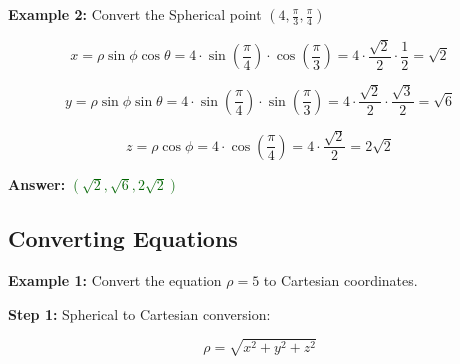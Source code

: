 \documentclass[10pt]{article}                               %
\begin{document}
\begin{adjustwidth}{2em}{0pt}
\begin{adjustwidth}{2em}{0pt}
\begin{examplebox}
\begin{adjustwidth}{2em}{0pt}
                \end{adjustwidth}

                \break

                \textbf{Example 2:} Convert the Spherical point \( \left(4, \frac{\pi}{3}, \frac{\pi}{4}\right) \)
                \vspace{0.5em}

                \begin{adjustwidth}{2em}{0pt}

                    \[ x = \rho\sin\phi\cos\theta = 4 \cdot \sin\left(\frac{\pi}{4}\right) \cdot \cos\left(\frac{\pi}{3}\right) = 4 \cdot \frac{\sqrt{2}}{2} \cdot \frac{1}{2} = \sqrt{2} \]

                    \[ y = \rho\sin\phi\sin\theta = 4 \cdot \sin\left(\frac{\pi}{4}\right) \cdot \sin\left(\frac{\pi}{3}\right) = 4 \cdot \frac{\sqrt{2}}{2} \cdot \frac{\sqrt{3}}{2} = \sqrt{6} \]

                    \[ z = \rho\cos\phi = 4 \cdot \cos\left(\frac{\pi}{4}\right) = 4 \cdot \frac{\sqrt{2}}{2} = 2\sqrt{2} \]

                    \textbf{Answer:} \textcolor{darkgreen}{\( \left(\sqrt{2}, \sqrt{6}, 2\sqrt{2}\right) \)}

                \end{adjustwidth}

            \end{examplebox}

            \begin{examplebox}
        
                \subsection*{Converting Equations}
            
                \textbf{Example 1:} Convert the equation \( \rho = 5 \) to Cartesian coordinates.
                \vspace{0.5em}
            
                \begin{adjustwidth}{2em}{0pt}
            
                    \textbf{Step 1:} Spherical to Cartesian conversion:
            
                    \vspace{0.25em}
            
                    \[ \rho = \sqrt{x^2 + y^2 + z^2} \]
            

\end{adjustwidth}
\end{examplebox}
\end{adjustwidth}
\end{adjustwidth}
\end{document}
